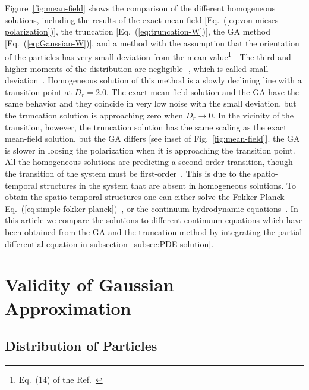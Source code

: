\documentclass[reprint,floatfix,amsmath,amssymb,aps,pre,showkeys,showpacs,superscriptaddress]{revtex4-1}
\newcommand{\hl}[1]{\textcolor{hlcolor}{#1}}
\newcommand{\req}[1]{Eq.~(\ref{#1})}
\begin{document}
Figure~\ref{fig:mean-field} shows \hl{the} comparison of the different homogeneous solutions, including the \hl{results of the exact mean-field} [\req{eq:von-mieses-polarization}], the truncation [\req{eq:truncation-W}], the GA \hl{method} [\req{eq:Gaussian-W}], \hl{and a method with the assumption that the orientation of the particles has very small deviation from the mean value\footnote{Eq.~(14) of the Ref.~\cite{allaei2016}} - The third and higher moments of the distribution are negligible -, which is called small deviation~\cite{allaei2016}. Homogeneous solution of this method is a slowly declining line with a transition point at $D_r=2.0$.} The \hl{exact mean-field solution} and the GA have the same behavior and they coincide in very low noise with the small deviation, but the truncation solution is approaching zero when $D_r \to 0$. In the vicinity of the transition, however, the truncation solution has the same scaling as the \hl{exact mean-field solution}, but the GA differs [see inset of Fig.~\ref{fig:mean-field}]. the GA is slower in loosing the polarization when it is approaching the transition point. All the homogeneous solutions are predicting a second-order transition, though the transition of the system must be first-order~\cite{Gregoire2004,nagy2007,Chate2008,Chate2008a,solon2015from,solon2015flocking,thuroff2014numerical}. This is due to the spatio-temporal structures in the system that are absent in homogeneous solutions. To obtain the spatio-temporal structures one can either solve the \hl{Fokker-Planck} \req{eq:simple-fokker-planck}~\cite{thuroff2014numerical,thuroff2013critical}, or the continuum hydrodynamic equations~\cite{Peshkov2012,solon2015flocking,solon2015from,allaei2016}. In this article we compare the solutions to different continuum equations \hl{which have been} obtained from the GA and the truncation method by integrating the partial differential equation in subsection~\ref{subsec:PDE-solution}.



\section{Validity of Gaussian Approximation}
\label{section:test}

\subsection{Distribution of Particles}
\end{document}
